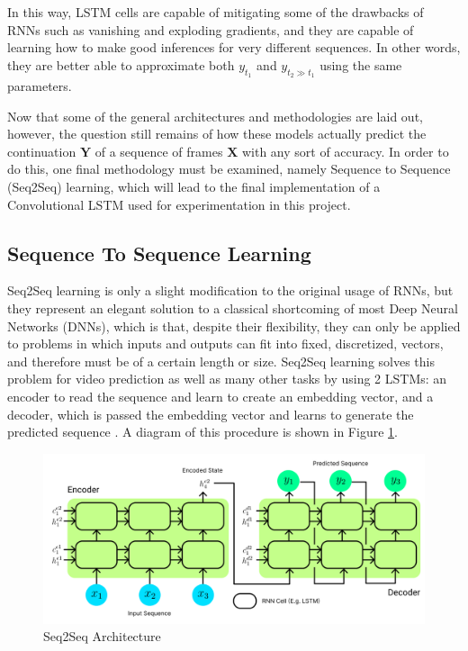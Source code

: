 \documentclass{scrartcl}
\begin{document}
In this way, LSTM cells are capable of mitigating some of the drawbacks of RNNs
such as vanishing and exploding gradients, and they are capable of learning how
to make good inferences for very different sequences. In other words, they are
better able to approximate both $y_{t_1}$ and $y_{t_2 \gg t_1}$ using the same
parameters.

Now that some of the general architectures and methodologies are laid out,
however, the question still remains of how these models actually predict the
continuation $\boldsymbol{Y}$ of a sequence of frames $\boldsymbol{X}$ with any
sort of accuracy. In order to do this, one final methodology must be examined,
namely Sequence to Sequence (Seq2Seq) learning, which will lead to the final
implementation of a Convolutional LSTM used for experimentation in this
project.

\subsection{Sequence To Sequence Learning}
\label{subsec:seq2seq}

Seq2Seq learning is only a slight modification to the original usage of RNNs,
but they represent an elegant solution to a classical shortcoming of most Deep
Neural Networks (DNNs), which is that, despite their flexibility, they can only
be applied to problems in which inputs and outputs can fit into fixed,
discretized, vectors, and therefore must be of a certain length or size.
Seq2Seq learning solves this problem for video prediction as well as many other
tasks by using 2 LSTMs: an encoder to read the sequence and learn to create an
embedding vector, and a decoder, which is passed the embedding vector and
learns to generate the predicted sequence \cite{seq2seq_original}. A diagram of
this procedure is shown in Figure \ref{fig:seq2seq_arch}.

\begin{figure}[H]
	\begin{center}
		\includegraphics[width=1\textwidth]{figures/seq2seq_arch.png}
	\end{center}
	\caption{Seq2Seq Architecture}
	\label{fig:seq2seq_arch}
\end{figure}
\end{document}
